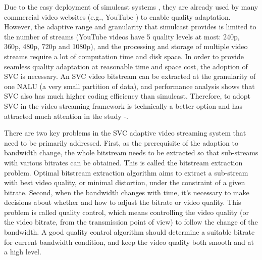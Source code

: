 \documentclass[journal]{IEEEtran}
\begin{document}
Due to the easy deployment of simulcast systems \cite{Bouten14}, they are already used by many commercial video websites (e.g., YouTube \cite{YouTube}) to enable quality adaptation. However, the adaptive range and granularity that simulcast provides is limited to the number of streams (YouTube videos have 5 quality levels at most: 240p, 360p, 480p, 720p and 1080p), and the processing and storage of multiple video streams require a lot of computation time and disk space. In order to provide seamless quality adaptation at reasonable time and space cost, the adoption of SVC is necessary. An SVC video bitstream can be extracted at the granularity of one NALU (a very small partition of data), and performance analysis \cite{SVCPerformance} shows that SVC also has much higher coding efficiency than simulcast. Therefore, to adopt SVC in the video streaming framework is technically a better option and has attracted much attention in the study \cite{Chuah12}-\cite{Cicalo14}.

There are two key problems in the SVC adaptive video streaming system that need to be primarily addressed. First, as the prerequisite of the adaption to bandwidth change, the whole bitstream needs to be extracted so that sub-streams with various bitrates can be obtained. This is called the bitstream extraction problem. Optimal bitstream extraction algorithm aims to extract a sub-stream with best video quality, or minimal distortion, under the constraint of a given bitrate. Second, when the bandwidth changes with time, it's necessary to make decisions about whether and how to adjust the bitrate or video quality. This problem is called quality control, which means controlling the video quality (or the video bitrate, from the transmission point of view) to follow the change of the bandwidth. A good quality control algorithm should determine a suitable bitrate for current bandwidth condition, and keep the video quality both smooth and at a high level.
\end{document}
